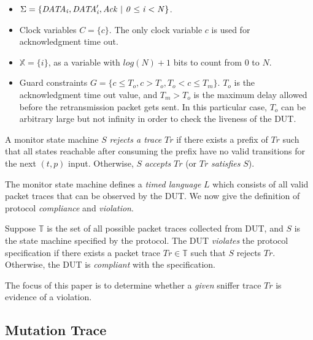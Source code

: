 \begin{itemize}
  \item $\Sigma = \{\it{DATA}_i, \it{DATA}'_i, Ack\ |\ 0 \le i < N\}$.
  \item Clock variables $C = \{c\}$. The only clock variable $c$ is
    used for acknowledgment time out.
  \item $\mathbb{X} = \{i\}$, as a variable with ${\mathit log}(N) + 1$ bits to
    count from $0$ to $N$.  
  \item Guard constraints $G = \{ c \le T_o, c > T_o, T_o < c \le T_m\}$.
    $T_o$ is the acknowledgment time out value, and $T_m >
    T_o$ is the maximum delay allowed before the retransmission packet gets
    sent. In this particular case, $T_o$ can be arbitrary large but not infinity
        in order to check the liveness of the DUT.
\end{itemize}


\begin{definition}
    A monitor state machine $S$ {\it rejects a trace} $Tr$ if there
    exists a prefix of $Tr$ such that all states reachable after consuming the
    prefix have no valid transitions for the next $(t, p)$ input. Otherwise, $S$
    {\it accepts} $Tr$ (or $Tr$ {\it satisfies} $S$).
\end{definition}


The monitor state machine defines a \textit{timed language} $L$ which consists
of all valid packet traces that can be observed by the DUT.  We now give the
definition of protocol \textit{compliance} and \textit{violation}.

\begin{definition}
  Suppose $\mathbb{T}$ is the set of all possible packet traces collected from
  DUT, and $S$ is the state machine specified by the protocol. The DUT
  \textit{violates} the protocol specification if there exists a
  packet trace $Tr \in \mathbb{T}$ such that $S$ rejects $Tr$.
  Otherwise, the DUT is \textit{compliant} with the specification.
\end{definition}

The focus of this paper is to determine whether a \textit{given} sniffer trace
$Tr$ is evidence of a violation.
%


\subsection{Mutation Trace}
\label{subsec:mutation}

